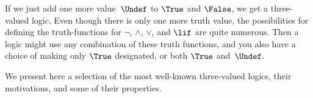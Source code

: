 \documentclass[../../../include/open-logic-section]{subfiles}
\begin{document}

If we just add one more value~$\Undef$ to $\True$ and $\False$, we get a
three-valued logic. Even though there is only one more truth value,
the possibilities for defining the truth-functions for $\lnot$,
$\land$, $\lor$, and $\lif$ are quite numerous. Then a logic might use
any combination of these truth functions, and you also have a choice
of making only $\True$ designated, or both $\True$ and~$\Undef$.

We present here a selection of the most well-known three-valued
logics, their motivations, and some of their properties.
\end{document}
